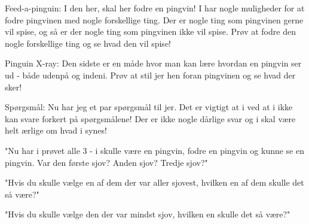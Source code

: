 Feed-a-pinguin:
I den her, skal her fodre en pingvin! I har nogle muligheder for at fodre pingvinen med nogle forskellige ting. Der er nogle ting som pingvinen gerne vil spise, og så er der nogle ting som pingvinen ikke vil spise. Prøv at fodre den nogle forskellige ting og se hvad den vil spise!

Pinguin X-ray:
Den sidste er en måde hvor man kan lære hvordan en pingvin ser ud - både udenpå og indeni. Prøv at stil jer hen foran pingvinen og se hvad der sker!

Spørgsmål:
Nu har jeg et par spørgsmål til jer. Det er vigtigt at i ved at i ikke kan svare forkert på spørgsmålene! Der er ikke nogle dårlige svar og i skal være helt ærlige om hvad i synes! 

"Nu har i prøvet alle 3 -  i skulle være en pingvin, fodre en pingvin og kunne se en pingvin. Var den første sjov? Anden sjov? Tredje sjov?"

"Hvis du skulle vælge en af dem der var aller sjovest, hvilken en af dem skulle det så være?"

"Hvis du skulle vælge den der var mindst sjov, hvilken en skulle det så være?"


